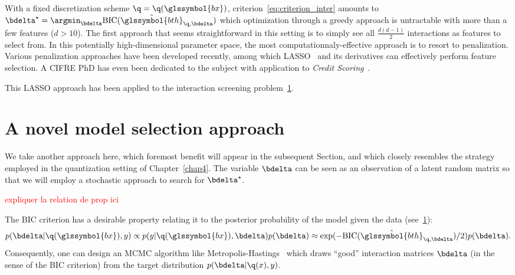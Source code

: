 With a fixed discretization scheme $\q = \q(\glssymbol{bx})$, criterion~\ref{eq:criterion_inter} amounts to $\bdelta^\star = \argmin_{\bdelta} \text{BIC}(\hat{\glssymbol{bth}}_{\q,\bdelta})$ which optimization through a greedy approach is untractable with more than a few features ($d > 10$). The first approach that seems straightforward in this setting is to simply see all $\frac{d(d-1)}{2}$ interactions as features to select from. In this potentially high-dimensional parameter space, the most computationnaly-effective approach is to resort to penalization. Various penalization approaches have been developed recently, among which LASSO~\cite{tibshirani1996regression} and its derivatives can effectively perform feature selection. A CIFRE PhD has even been dedicated to the subject with application to \textit{Credit Scoring}~\cite{vital2016}.

This LASSO approach has been applied to the interaction screening problem~\ref{}.

\section{A novel model selection approach}

We take another approach here, which foremost benefit will appear in the subsequent Section, and which closely resembles the strategy employed in the quantization setting of Chapter~\ref{chap4}. The variable $\bdelta$ can be seen as an observation of a latent random matrix so that we will employ a stochastic approach to search for $\bdelta^\star$.

\textcolor{red}{expliquer la relation de prop ici}

The BIC criterion has a desirable property relating it to the posterior probability of the model given the data (see~\ref{}):
\[ p(\bdelta | \q(\glssymbol{bx}), y) \propto p(y | \q(\glssymbol{bx}), \bdelta) p(\bdelta) \approx \exp(-\text{BIC}(\hat{\glssymbol{bth}}_{\q,\bdelta})/2)  p(\bdelta).\]
Consequently, one can design an MCMC algorithm like Metropolis-Hastings~\cite{hastings1970monte} which draws ``good'' interaction matrices $\bdelta$ (in the sense of the BIC criterion) from the target distribution $p(\bdelta | \q(x), y)$.

